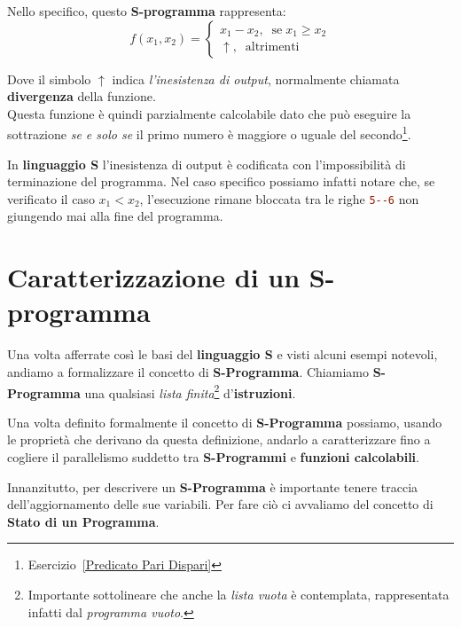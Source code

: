 Nello specifico, questo \textbf{S-programma} rappresenta:
\begin{equation}
  f(x_1, x_2)=\begin{cases}
    x_1-x_2, \;\; \text{se}\; x_1\geqslant x_2\\
    \uparrow, \;\;\text{altrimenti}
  \end{cases}
  \label{Funzione Sottrazione Eq}
\end{equation}

Dove il simbolo \(\uparrow\) indica \textit{l'inesistenza di output}, normalmente chiamata \textbf{divergenza} della funzione.\\
Questa funzione è quindi parzialmente calcolabile dato che può eseguire la sottrazione \textit{se e solo se} il primo numero è maggiore o uguale del secondo\footnote{Esercizio~\ref{Predicato Pari Dispari}}.

In \textbf{linguaggio S} l'inesistenza di output è codificata con l'impossibilità di terminazione del programma. Nel caso specifico possiamo infatti notare che, se verificato il caso \(x_1 < x_2\), l'esecuzione rimane bloccata tra le righe \lstinline[language=ini]{5--6} non giungendo mai alla fine del programma.

\section{Caratterizzazione di un S-programma}

Una volta afferrate così le basi del \textbf{linguaggio S} e visti alcuni esempi notevoli, andiamo a formalizzare il concetto di \textbf{S-Programma}.
Chiamiamo \textbf{S-Programma} una qualsiasi \textit{lista finita}\footnote{Importante sottolineare che anche la \textit{lista vuota} è contemplata,
rappresentata infatti dal \textit{programma vuoto}.} d'\textbf{istruzioni}.


Una volta definito formalmente il concetto di \textbf{S-Programma} possiamo, usando le proprietà che derivano da questa definizione,
andarlo a caratterizzare fino a cogliere il parallelismo suddetto tra \textbf{S-Programmi} e \textbf{funzioni calcolabili}.

Innanzitutto, per descrivere un \textbf{S-Programma} è importante tenere traccia dell'aggiornamento delle sue variabili. Per fare ciò ci avvaliamo del concetto di
\textbf{Stato di un Programma}.


